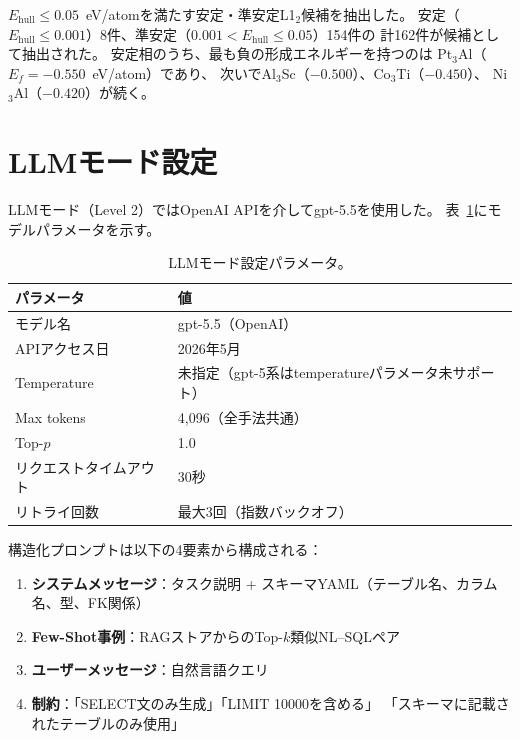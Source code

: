 \documentclass[5p,twocolumn]{elsarticle}
\begin{document}
$E_\text{hull} \leq 0.05$~eV/atomを満たす安定・準安定L1$_2$候補を抽出した。
安定（$E_\text{hull} \leq 0.001$）8件、準安定（$0.001 < E_\text{hull} \leq 0.05$）154件の
計162件が候補として抽出された。
安定相のうち、最も負の形成エネルギーを持つのは
Pt$_3$Al（$E_f = -0.550$~eV/atom）であり、
次いでAl$_3$Sc（$-0.500$）、Co$_3$Ti（$-0.450$）、
Ni$_3$Al（$-0.420$）が続く。

\section{LLMモード設定}
\label{sec:sup_llm_config}

LLMモード（Level 2）ではOpenAI APIを介してgpt-5.5を使用した。
表~\ref{tab:sup_llm_params}にモデルパラメータを示す。

\begin{table}[htbp]
  \centering
  \caption{LLMモード設定パラメータ。}
  \label{tab:sup_llm_params}
  \small
  \begin{tabular}{ll}
    \toprule
    パラメータ & 値 \\
    \midrule
    モデル名 & gpt-5.5（OpenAI） \\
    APIアクセス日 & 2026年5月 \\
    Temperature & 未指定（gpt-5系はtemperatureパラメータ未サポート） \\
    Max tokens & 4{,}096（全手法共通） \\
    Top-$p$ & 1.0 \\
    リクエストタイムアウト & 30秒 \\
    リトライ回数 & 最大3回（指数バックオフ） \\
    \bottomrule
  \end{tabular}
\end{table}

構造化プロンプトは以下の4要素から構成される：

\begin{enumerate}
  \item \textbf{システムメッセージ}：タスク説明 + スキーマYAML（テーブル名、カラム名、型、FK関係）
  \item \textbf{Few-Shot事例}：RAGストアからのTop-$k$類似NL--SQLペア
  \item \textbf{ユーザーメッセージ}：自然言語クエリ
  \item \textbf{制約}：「SELECT文のみ生成」「LIMIT 10000を含める」
        「スキーマに記載されたテーブルのみ使用」
\end{enumerate}
\end{document}
